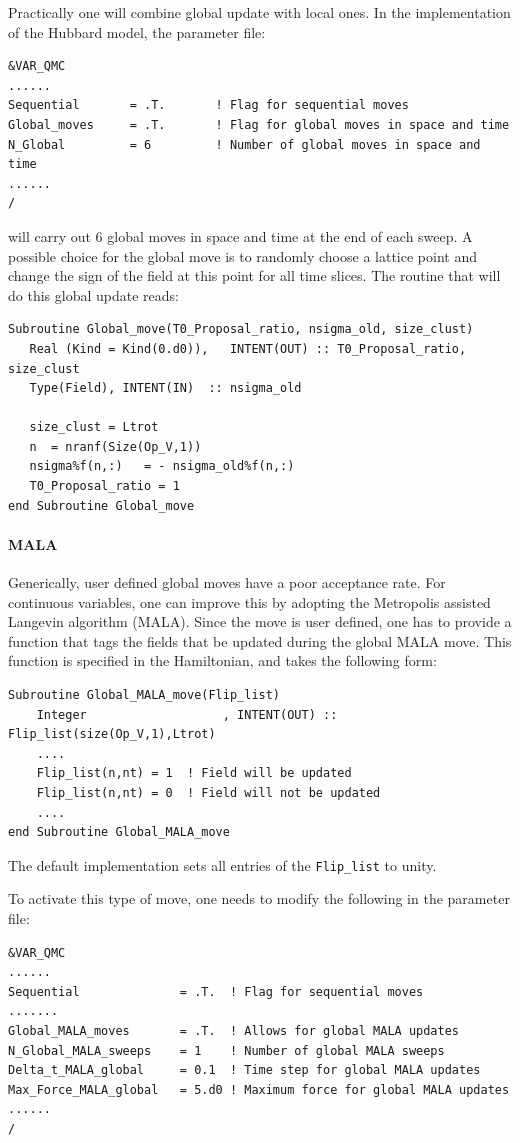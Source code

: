 Practically one will combine global update with local ones. In the implementation  of the Hubbard model,   the parameter file: 
\begin{lstlisting}[style=fortran]
&VAR_QMC
......
Sequential       = .T.       ! Flag for sequential moves
Global_moves     = .T.       ! Flag for global moves in space and time
N_Global         = 6         ! Number of global moves in space and time
......
/
\end{lstlisting}
will carry out 6 global moves in space and time at the end of each sweep. A  possible choice for the global move is to randomly choose a 
lattice point and change the sign of the field at this point for all time slices.  The routine that will do this global update reads:
\begin{lstlisting}[style=fortran]
Subroutine Global_move(T0_Proposal_ratio, nsigma_old, size_clust)
   Real (Kind = Kind(0.d0)),   INTENT(OUT) :: T0_Proposal_ratio, size_clust
   Type(Field), INTENT(IN)  :: nsigma_old

   size_clust = Ltrot
   n  = nranf(Size(Op_V,1))
   nsigma%f(n,:)   = - nsigma_old%f(n,:) 
   T0_Proposal_ratio = 1
end Subroutine Global_move
\end{lstlisting}

\paragraph{MALA} 
\label{sec:global_space_time_MALA}
Generically,  user defined global moves have a poor acceptance rate. For continuous variables, one  can improve this by adopting the 
Metropolis assisted Langevin algorithm (MALA).   
Since the move is user defined, one has to provide a function that tags the fields that be updated during the global MALA move.
This function is specified in the  Hamiltonian, and takes the following  form: 
\begin{lstlisting}[style=fortran]   
Subroutine Global_MALA_move(Flip_list)
	Integer                   , INTENT(OUT) :: Flip_list(size(Op_V,1),Ltrot)
	....
	Flip_list(n,nt) = 1  ! Field will be updated
	Flip_list(n,nt) = 0  ! Field will not be updated
	....
end Subroutine Global_MALA_move
\end{lstlisting}
The default implementation sets all entries of the \texttt{Flip\_list} to unity. 

To activate this type of move, one  needs to modify the following in the parameter file:

\begin{lstlisting}[style=fortran]   
&VAR_QMC
......
Sequential              = .T.  ! Flag for sequential moves
.......
Global_MALA_moves       = .T.  ! Allows for global MALA updates
N_Global_MALA_sweeps    = 1    ! Number of global MALA sweeps
Delta_t_MALA_global     = 0.1  ! Time step for global MALA updates
Max_Force_MALA_global   = 5.d0 ! Maximum force for global MALA updates
......
/
\end{lstlisting}
% 

